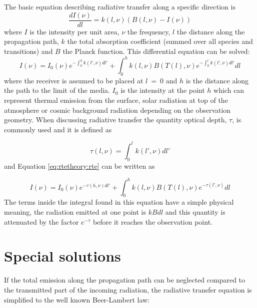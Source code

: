  The basic equation describing radiative transfer along a specific 
 direction is
 \begin{equation}
   \frac{dI(\nu)}{dl} = k(l,\nu)(B(l,\nu)-I(\nu))
  \label{eq:rtetheory:chand}
 \end{equation} 
 where $I$ is the intensity per unit area, $\nu$ the frequency, $l$
 the distance along the propagation path, $k$ the total absorption
 coefficient (summed over all species and transitions) and $B$ the
 Planck function. This differential equation can be solved:
 \begin{equation}
   I(\nu) = I_0(\nu)e^{-\int^h_0{k(l',\nu)dl'}} + 
     \int^h_0{k(l,\nu)B(T(l),\nu) e^{-\int^l_0{k(l',\nu)dl'}} dl}
  \label{eq:rtetheory:rte}
 \end{equation}  
 where the receiver is assumed to be placed at $l$~=~0 and $h$ is the
 distance along the path to the limit of the media. $I_0$ is the
 intensity at the point $h$ which can represent thermal emission from
 the surface, solar radiation at top of the atmosphere or cosmic
 background radiation depending on the observation geometry. When
 discussing radiative transfer the quantity optical depth, $\tau$, is
 commonly used and it is defined as

 \begin{equation}
   \tau(l,\nu) = \int^l_0{k(l',\nu)dl'} 
  \label{eq:rtetheory:tau}
 \end{equation}  
 and Equation \ref{eq:rtetheory:rte} can be written as
 
 \begin{equation}
   I(\nu) = I_0(\nu)e^{-\tau(h,\nu)dl'} + 
     \int^h_0{k(l,\nu)B(T(l),\nu) e^{-\tau(l',\nu)} dl}
  \label{eq:rtetheory:rte2}
 \end{equation}  
 The terms inside the integral found in this equation have a simple
 physical meaning, the radiation emitted at one point is $kBdl$ and this
 quantity is attenuated by the factor $e^{-\tau}$ before it reaches the
 observation point.




\section{Special solutions}
 \label{sec:rtetheory:special}
 
 If the total emission along the propagation path can be neglected
 compared to the transmitted part of the incoming radiation, the
 radiative transfer equation is simplified to the well known Beer-Lambert law:
 
